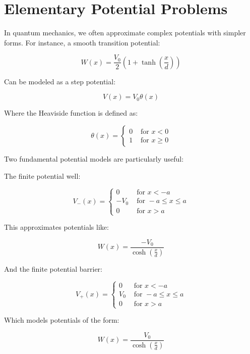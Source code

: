 \chapter{Elementary Potential Problems}

In quantum mechanics, we often approximate complex potentials with simpler forms. For instance, a smooth transition potential:

\begin{equation}
W(x)=\frac{V_{0}}{2}\left(1+\tanh \left(\frac{x}{d}\right)\right)
\end{equation}

Can be modeled as a step potential:

\begin{equation}
V(x)=V_{0} \theta(x)
\end{equation}

Where the Heaviside function is defined as:

\[
\theta(x)= \begin{cases}0 & \text { for } x<0  \\ 1 & \text { for } x \geq 0\end{cases}
\]

Two fundamental potential models are particularly useful:

The finite potential well:

\[
V_{-}(x)= \begin{cases}0 & \text { for } x<-a  \\ -V_{0} & \text { for }-a \leq x \leq a \\ 0 & \text { for } x>a\end{cases}
\]

This approximates potentials like:

\begin{equation}
W(x)=\frac{-V_{0}}{\cosh \left(\frac{x}{d}\right)}
\end{equation}

And the finite potential barrier:

\[
V_{+}(x)= \begin{cases}0 & \text { for } x<-a  \\ V_{0} & \text { for }-a \leq x \leq a \\ 0 & \text { for } x>a\end{cases}
\]

Which models potentials of the form:

\begin{equation}
W(x)=\frac{V_{0}}{\cosh \left(\frac{x}{d}\right)}
\end{equation}

